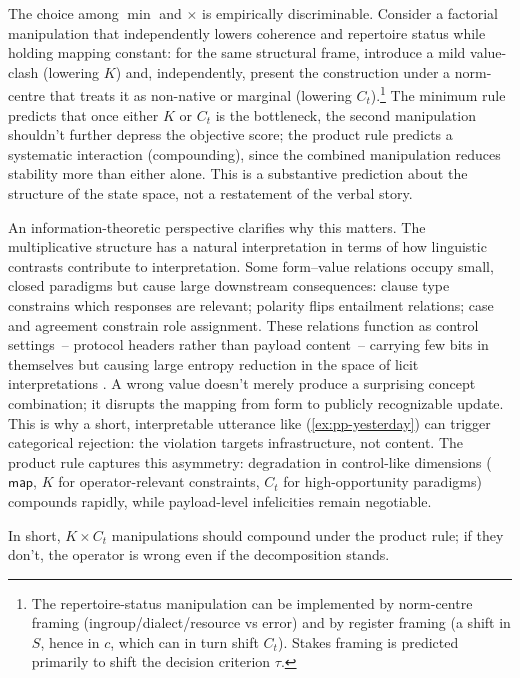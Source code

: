 \documentclass[12pt,letterpaper]{article}
\begin{document}
The choice among $\min$ and $\times$ is empirically discriminable. Consider a factorial manipulation that independently lowers coherence and repertoire status while holding mapping constant: for the same structural frame, introduce a mild value-clash (lowering $K$) and, independently, present the construction under a norm-centre that treats it as non-native or marginal (lowering $C_t$).\footnote{The repertoire-status manipulation can be implemented by norm-centre framing (ingroup/dialect/resource vs error) and by register framing (a shift in $S$, hence in $c$, which can in turn shift $C_t$). Stakes framing is predicted primarily to shift the decision criterion $\tau$.} The minimum rule predicts that once either $K$ or $C_t$ is the bottleneck, the second manipulation shouldn't further depress the objective score; the product rule predicts a systematic interaction (compounding), since the combined manipulation reduces stability more than either alone. This is a substantive prediction about the structure of the state space, not a restatement of the verbal story.

An information-theoretic perspective clarifies why this matters. The multiplicative structure has a natural interpretation in terms of how linguistic contrasts contribute to interpretation. Some form--value relations occupy small, closed paradigms but cause large downstream consequences: clause type constrains which responses are relevant; polarity flips entailment relations; case and agreement constrain role assignment. These relations function as control settings~-- protocol headers rather than payload content~-- carrying few bits in themselves but causing large entropy reduction in the space of licit interpretations \autocite{shannon1948,coverthomas2006}. A wrong value doesn't merely produce a surprising concept combination; it disrupts the mapping from form to publicly recognizable update. This is why a short, interpretable utterance like (\ref{ex:pp-yesterday}) can trigger categorical rejection: the violation targets infrastructure, not content. The product rule captures this asymmetry: degradation in control-like dimensions ($\mathsf{map}$, $K$ for operator-relevant constraints, $C_t$ for high-opportunity paradigms) compounds rapidly, while payload-level infelicities remain negotiable.

In short, $K \times C_t$ manipulations should compound under the product rule; if they don't, the operator is wrong even if the decomposition stands.
\end{document}
